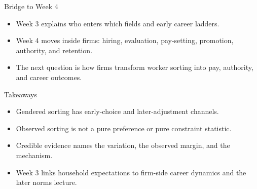\documentclass[aspectratio=169,11pt]{beamer}
\begin{document}
\begin{frame}{Bridge to Week 4}
\begin{itemize}
    \item Week 3 explains who enters which fields and early career ladders.
    \item Week 4 moves inside firms: hiring, evaluation, pay-setting, promotion, authority, and retention.
    \item The next question is how firms transform worker sorting into pay, authority, and career outcomes.
\end{itemize}
\end{frame}

\begin{frame}{Takeaways}
\begin{itemize}
    \item Gendered sorting has early-choice and later-adjustment channels.
    \item Observed sorting is not a pure preference or pure constraint statistic.
    \item Credible evidence names the variation, the observed margin, and the mechanism.
    \item Week 3 links household expectations to firm-side career dynamics and the later norms lecture.
\end{itemize}
\end{frame}
\end{document}
